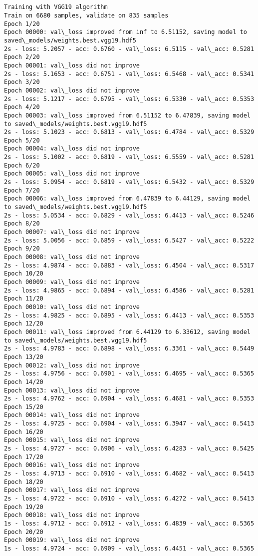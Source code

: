 \documentclass[11pt]{article}
\begin{document}
    \begin{Verbatim}[commandchars=\\\{\}]


Training with VGG19 algorithm
Train on 6680 samples, validate on 835 samples
Epoch 1/20
Epoch 00000: val\_loss improved from inf to 6.51152, saving model to saved\_models/weights.best.vgg19.hdf5
2s - loss: 5.2057 - acc: 0.6760 - val\_loss: 6.5115 - val\_acc: 0.5281
Epoch 2/20
Epoch 00001: val\_loss did not improve
2s - loss: 5.1653 - acc: 0.6751 - val\_loss: 6.5468 - val\_acc: 0.5341
Epoch 3/20
Epoch 00002: val\_loss did not improve
2s - loss: 5.1217 - acc: 0.6795 - val\_loss: 6.5330 - val\_acc: 0.5353
Epoch 4/20
Epoch 00003: val\_loss improved from 6.51152 to 6.47839, saving model to saved\_models/weights.best.vgg19.hdf5
2s - loss: 5.1023 - acc: 0.6813 - val\_loss: 6.4784 - val\_acc: 0.5329
Epoch 5/20
Epoch 00004: val\_loss did not improve
2s - loss: 5.1002 - acc: 0.6819 - val\_loss: 6.5559 - val\_acc: 0.5281
Epoch 6/20
Epoch 00005: val\_loss did not improve
2s - loss: 5.0954 - acc: 0.6819 - val\_loss: 6.5432 - val\_acc: 0.5329
Epoch 7/20
Epoch 00006: val\_loss improved from 6.47839 to 6.44129, saving model to saved\_models/weights.best.vgg19.hdf5
2s - loss: 5.0534 - acc: 0.6829 - val\_loss: 6.4413 - val\_acc: 0.5246
Epoch 8/20
Epoch 00007: val\_loss did not improve
2s - loss: 5.0056 - acc: 0.6859 - val\_loss: 6.5427 - val\_acc: 0.5222
Epoch 9/20
Epoch 00008: val\_loss did not improve
2s - loss: 4.9874 - acc: 0.6883 - val\_loss: 6.4504 - val\_acc: 0.5317
Epoch 10/20
Epoch 00009: val\_loss did not improve
2s - loss: 4.9865 - acc: 0.6894 - val\_loss: 6.4586 - val\_acc: 0.5281
Epoch 11/20
Epoch 00010: val\_loss did not improve
2s - loss: 4.9825 - acc: 0.6895 - val\_loss: 6.4413 - val\_acc: 0.5353
Epoch 12/20
Epoch 00011: val\_loss improved from 6.44129 to 6.33612, saving model to saved\_models/weights.best.vgg19.hdf5
2s - loss: 4.9783 - acc: 0.6898 - val\_loss: 6.3361 - val\_acc: 0.5449
Epoch 13/20
Epoch 00012: val\_loss did not improve
2s - loss: 4.9756 - acc: 0.6901 - val\_loss: 6.4695 - val\_acc: 0.5365
Epoch 14/20
Epoch 00013: val\_loss did not improve
2s - loss: 4.9762 - acc: 0.6904 - val\_loss: 6.4681 - val\_acc: 0.5353
Epoch 15/20
Epoch 00014: val\_loss did not improve
2s - loss: 4.9725 - acc: 0.6904 - val\_loss: 6.3947 - val\_acc: 0.5413
Epoch 16/20
Epoch 00015: val\_loss did not improve
2s - loss: 4.9727 - acc: 0.6906 - val\_loss: 6.4283 - val\_acc: 0.5425
Epoch 17/20
Epoch 00016: val\_loss did not improve
2s - loss: 4.9713 - acc: 0.6910 - val\_loss: 6.4682 - val\_acc: 0.5413
Epoch 18/20
Epoch 00017: val\_loss did not improve
2s - loss: 4.9722 - acc: 0.6910 - val\_loss: 6.4272 - val\_acc: 0.5413
Epoch 19/20
Epoch 00018: val\_loss did not improve
1s - loss: 4.9712 - acc: 0.6912 - val\_loss: 6.4839 - val\_acc: 0.5365
Epoch 20/20
Epoch 00019: val\_loss did not improve
1s - loss: 4.9724 - acc: 0.6909 - val\_loss: 6.4451 - val\_acc: 0.5365



\end{Verbatim}
\end{document}
